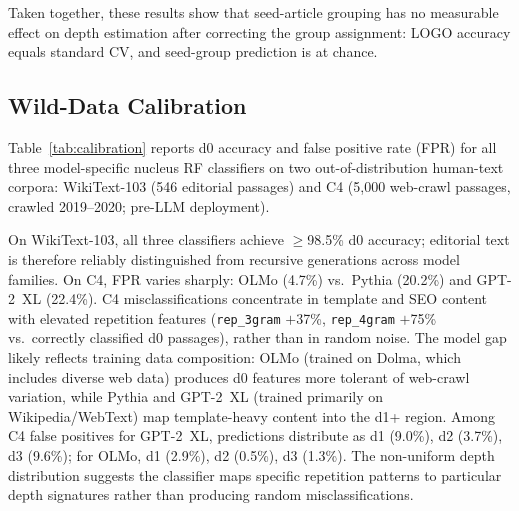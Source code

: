 Taken together, these results show that seed-article grouping has no measurable effect on depth estimation after correcting the group assignment: LOGO accuracy equals standard CV, and seed-group prediction is at chance.

\subsection{Wild-Data Calibration}
\label{app:calibration}

Table~\ref{tab:calibration} reports d0 accuracy and false positive rate (FPR) for all three model-specific nucleus RF classifiers on two out-of-distribution human-text corpora: WikiText-103 (546 editorial passages) and C4 (5{,}000 web-crawl passages, crawled 2019--2020; pre-LLM deployment).

\begin{table}[h]
\centering
\small
\caption{Wild-data d0 accuracy and FPR for nucleus RF classifiers. All passages are human-written (true d0). FPR = fraction misclassified as d1+. 95\% Wilson CIs computed for C4 ($n{=}5{,}000$).}
\label{tab:calibration}
\end{table}

On WikiText-103, all three classifiers achieve $\geq$98.5\% d0 accuracy; editorial text is therefore reliably distinguished from recursive generations across model families.
On C4, FPR varies sharply: OLMo (4.7\%) vs.\ Pythia (20.2\%) and GPT-2~XL (22.4\%).
C4 misclassifications concentrate in template and SEO content with elevated repetition features (\texttt{rep\_3gram} $+$37\%, \texttt{rep\_4gram} $+$75\% vs.\ correctly classified d0 passages), rather than in random noise.
The model gap likely reflects training data composition: OLMo (trained on Dolma, which includes diverse web data) produces d0 features more tolerant of web-crawl variation, while Pythia and GPT-2~XL (trained primarily on Wikipedia/WebText) map template-heavy content into the d1+ region.
Among C4 false positives for GPT-2~XL, predictions distribute as d1 (9.0\%), d2 (3.7\%), d3 (9.6\%); for OLMo, d1 (2.9\%), d2 (0.5\%), d3 (1.3\%). The non-uniform depth distribution suggests the classifier maps specific repetition patterns to particular depth signatures rather than producing random misclassifications.

